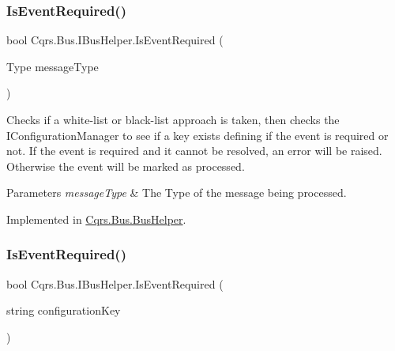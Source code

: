 \subsubsection{\texorpdfstring{Is\+Event\+Required()}{IsEventRequired()}\hspace{0.1cm}{\footnotesize\ttfamily [1/2]}}
{\footnotesize\ttfamily bool Cqrs.\+Bus.\+I\+Bus\+Helper.\+Is\+Event\+Required (\begin{DoxyParamCaption}\item[{Type}]{message\+Type }\end{DoxyParamCaption})}



Checks if a white-\/list or black-\/list approach is taken, then checks the I\+Configuration\+Manager to see if a key exists defining if the event is required or not. If the event is required and it cannot be resolved, an error will be raised. Otherwise the event will be marked as processed. 


\begin{DoxyParams}{Parameters}
{\em message\+Type} & The Type of the message being processed.\\
\hline
\end{DoxyParams}


Implemented in \hyperlink{classCqrs_1_1Bus_1_1BusHelper_a28c675e976adbf348637ec6ff6410c1a_a28c675e976adbf348637ec6ff6410c1a}{Cqrs.\+Bus.\+Bus\+Helper}.

\mbox{\label{interfaceCqrs_1_1Bus_1_1IBusHelper_af73d0d2aa8e98566acb4b2fb13a3e986_af73d0d2aa8e98566acb4b2fb13a3e986}} 
\subsubsection{\texorpdfstring{Is\+Event\+Required()}{IsEventRequired()}\hspace{0.1cm}{\footnotesize\ttfamily [2/2]}}
{\footnotesize\ttfamily bool Cqrs.\+Bus.\+I\+Bus\+Helper.\+Is\+Event\+Required (\begin{DoxyParamCaption}\item[{string}]{configuration\+Key }\end{DoxyParamCaption})}



